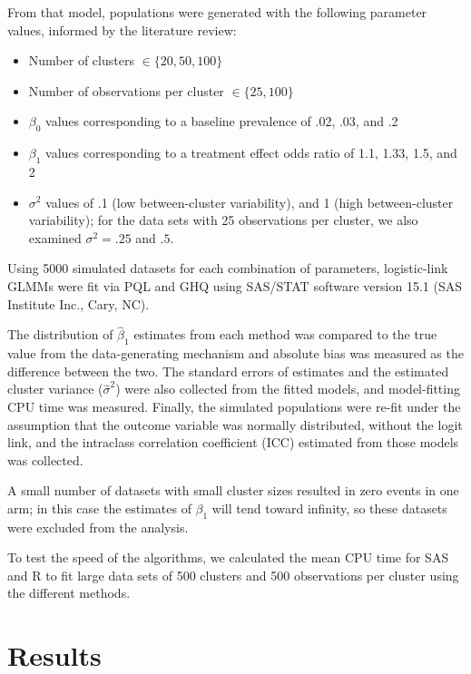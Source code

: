 \documentclass[Afour,times,sagev,doublespace]{sagej}
\begin{document}
From that model, populations were generated with the following parameter values, informed by the literature review:
\begin{itemize}
    \item Number of clusters $\in \{20, 50, 100\}$
    \item Number of observations per cluster $\in \{25, 100\}$
    \item $\beta_0$ values corresponding to a baseline prevalence of .02, .03, and .2
    \item $\beta_1$ values corresponding to a treatment effect odds ratio of 1.1, 1.33, 1.5, and 2
    \item $\sigma^2$ values of .1 (low between-cluster variability), and 1 (high between-cluster variability); for the data sets with 25 observations per cluster, we also examined $\sigma^2=.25$ and $.5$.
\end{itemize}

Using 5000 simulated datasets for each combination of parameters, logistic-link GLMMs were fit via PQL and GHQ using SAS/STAT software version 15.1 (SAS Institute Inc., Cary, NC).

The distribution of $\hat{\beta}_1$ estimates from each method was compared to the true value from the data-generating mechanism and absolute bias was measured as the difference between the two. The standard errors of estimates and the estimated cluster variance ($\hat{\sigma}^2$) were also collected from the fitted models, and model-fitting CPU time was measured. Finally, the simulated populations were re-fit under the assumption that the outcome variable was normally distributed, without the logit link, and the intraclass correlation coefficient (ICC) estimated from those models was collected.

A small number of datasets with small cluster sizes resulted in zero events in one arm; in this case the estimates of $\beta_1$ will tend toward infinity, so these datasets were excluded from the analysis.

To test the speed of the algorithms, we calculated the mean CPU time for SAS and R to fit large data sets of 500 clusters and 500 observations per cluster using the different methods.





\section{Results}
\end{document}
